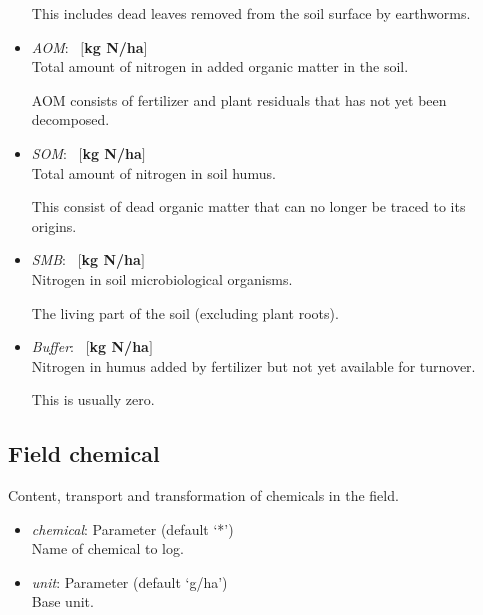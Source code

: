 \documentclass[a4paper]{article}
\begin{document}
\begin{itemize}
This includes dead leaves removed from the soil surface by earthworms.
\item \textit{AOM}: ~$[$\textbf{kg N/ha}$]$\\
Total amount of nitrogen in added organic matter in the soil.

AOM consists of fertilizer and plant residuals that has not yet been 
decomposed.
\item \textit{SOM}: ~$[$\textbf{kg N/ha}$]$\\
Total amount of nitrogen in soil humus.

This consist of dead organic matter that can no longer be traced
to its origins.
\item \textit{SMB}: ~$[$\textbf{kg N/ha}$]$\\
Nitrogen in soil microbiological organisms.

The living part of the soil (excluding plant roots).
\item \textit{Buffer}: ~$[$\textbf{kg N/ha}$]$\\
Nitrogen in humus added by fertilizer but not yet available for turnover.

This is usually zero.
\end{itemize}

\subsection{Field chemical}

Content, transport and transformation of chemicals in the field.
\begin{itemize}
\item \textit{chemical}: Parameter (default `*')\\
Name of chemical to log.
\item \textit{unit}: Parameter (default `g/ha')\\
Base unit.
\end{itemize}
\end{document}
